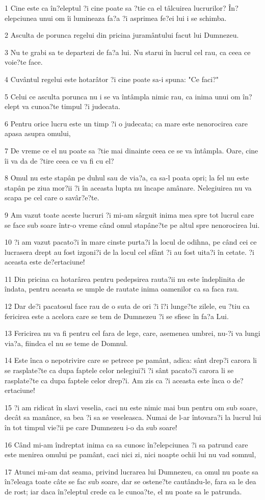 \par 1 Cine este ca în?eleptul ?i cine poate sa ?tie ca el tâlcuirea lucrurilor? În?elepciunea unui om îi lumineaza fa?a ?i asprimea fe?ei lui i se schimba.
\par 2 Asculta de porunca regelui din pricina juramântului facut lui Dumnezeu.
\par 3 Nu te grabi sa te departezi de fa?a lui. Nu starui în lucrul cel rau, ca ceea ce voie?te face.
\par 4 Cuvântul regelui este hotarâtor ?i cine poate sa-i spuna: "Ce faci?"
\par 5 Celui ce asculta porunca nu i se va întâmpla nimic rau, ca inima unui om în?elept va cunoa?te timpul ?i judecata.
\par 6 Pentru orice lucru este un timp ?i o judecata; ca mare este nenorocirea care apasa asupra omului,
\par 7 De vreme ce el nu poate sa ?tie mai dinainte ceea ce se va întâmpla. Oare, cine îi va da de ?tire ceea ce va fi cu el?
\par 8 Omul nu este stapân pe duhul sau de via?a, ca sa-l poata opri; la fel nu este stapân pe ziua mor?ii ?i în aceasta lupta nu încape amânare. Nelegiuirea nu va scapa pe cel care o savâr?e?te.
\par 9 Am vazut toate aceste lucruri ?i mi-am sârguit inima mea spre tot lucrul care se face sub soare într-o vreme când omul stapâne?te pe altul spre nenorocirea lui.
\par 10 ?i am vazut pacato?i în mare cinste purta?i la locul de odihna, pe când cei ce lucrasera drept au fost izgoni?i de la locul cel sfânt ?i au fost uita?i în cetate. ?i aceasta este de?ertaciune!
\par 11 Din pricina ca hotarârea pentru pedepsirea rauta?ii nu este îndeplinita de îndata, pentru aceasta se umple de rautate inima oamenilor ca sa faca rau.
\par 12 Dar de?i pacatosul face rau de o suta de ori ?i î?i lunge?te zilele, eu ?tiu ca fericirea este a acelora care se tem de Dumnezeu ?i se sfiesc în fa?a Lui.
\par 13 Fericirea nu va fi pentru cel fara de lege, care, asemenea umbrei, nu-?i va lungi via?a, fiindca el nu se teme de Domnul.
\par 14 Este înca o nepotrivire care se petrece pe pamânt, adica: sânt drep?i carora li se rasplate?te ca dupa faptele celor nelegiui?i ?i sânt pacato?i carora li se rasplate?te ca dupa faptele celor drep?i. Am zis ca ?i aceasta este înca o de?ertaciune!
\par 15 ?i am ridicat în slavi veselia, caci nu este nimic mai bun pentru om sub soare, decât sa manânce, sa bea ?i sa se veseleasca. Numai de l-ar întovara?i la lucrul lui în tot timpul vie?ii pe care Dumnezeu i-o da sub soare!
\par 16 Când mi-am îndreptat inima ca sa cunosc în?elepciunea ?i sa patrund care este menirea omului pe pamânt, caci nici zi, nici noapte ochii lui nu vad somnul,
\par 17 Atunci mi-am dat seama, privind lucrarea lui Dumnezeu, ca omul nu poate sa în?eleaga toate câte se fac sub soare, dar se ostene?te cautându-le, fara sa le dea de rost; iar daca în?eleptul crede ca le cunoa?te, el nu poate sa le patrunda.


